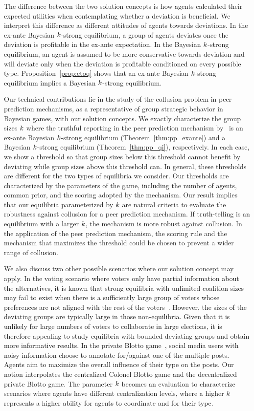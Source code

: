 The difference between the two solution concepts is how agents calculated their expected utilities when contemplating whether a deviation is beneficial. 
We interpret this difference as different attitudes of agents towards deviations.
In the ex-ante Bayesian $k$-strong equilibrium, a group of agents deviates once the deviation is profitable in the ex-ante expectation. In the Bayesian $k$-strong equilibrium, an agent is assumed to be more conservative towards deviation and will deviate only when the deviation is profitable conditioned on every possible type. 
Proposition~\ref{prop:etoq} shows that an ex-ante Bayesian $k$-strong equilibrium implies a Bayesian $k$-strong equilibrium.

Our technical contributions lie in the study of the collusion problem in peer prediction mechanisms, as a representative of group strategic behavior in Bayesian games, with our solution concepts. We exactly characterize the group sizes $k$ where the truthful reporting in the peer prediction mechanism by~\citep{Miller05:Eliciting} is an ex-ante Bayesian $k$-strong equilibrium (Theorem~\ref{thm:pp_exante}) and a Bayesian $k$-strong equilibrium (Theorem~\ref{thm:pp_qi}), respectively.  In each case, we show a threshold so that group sizes below this threshold cannot benefit by deviating while group sizes above this threshold can.  In general, these thresholds are different for the two types of equilibria we consider.   
Our thresholds are characterized by the parameters of the game, including the number of agents, common prior, and the scoring adopted by the mechanism. Our result implies that our equilibria parameterized by $k$ are natural criteria to evaluate the robustness against collusion for a peer prediction mechanism. If truth-telling is an equilibrium with a larger $k$, the mechanism is more robust against collusion. In the application of the peer prediction mechanism, the scoring rule and the mechanism that maximizes the threshold could be chosen to prevent a wider range of collusion. 

We also discuss two other possible scenarios where our solution concept may apply. In the voting scenario where voters only have partial information about the alternatives, it is known that strong equilibria with unlimited coalition sizes may fail to exist when there is a sufficiently large group of voters whose preferences are not aligned with the rest of the voters~\cite{deng2024aggregation}. However, the sizes of the deviating groups are typically large in those non-equilibria. Given that it is unlikely for large numbers of voters to collaborate in large elections, it is therefore appealing to study equilibria with bounded deviating groups and obtain more informative results. In the private Blotto game~\citep{donahue2023private}, social media users with noisy information choose to annotate for/against one of the multiple posts. Agents aim to maximize the overall influence of their type on the posts. Our notion interpolates the centralized Colonel Blotto game and the decentralized private Blotto game. The parameter $k$ becomes an evaluation to characterize scenarios where agents have different centralization levels, where a higher $k$ represents a higher ability for agents to coordinate and for their type.

